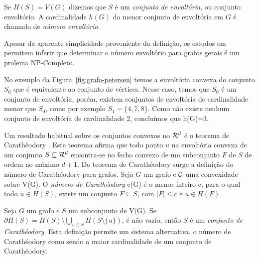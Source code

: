 Se $H(S)=V(G)$ dizemos que $S$ é  um \textit{conjunto de envoltória}, ou conjunto envoltório. 
A cardinalidade $h(G)$ do menor conjunto de envoltória em $G$ é chamado de 
\textit{número envoltório}.

Apesar da aparente simplicidade proveniente da definição,
os estudos em \cite{Dourado2009} permitem inferir que determinar o número envoltório para grafos gerais é um prolema NP-Completo.

No exemplo da Figura~\ref{fig:grafo-petersen} 
temos a envoltória convexa do conjunto $S_0$ que é equivalente ao conjunto de vértices.
Nesse caso, temos que $S_0$ é um conjunto de envoltória, porém, existem conjuntos de envoltória de cardinalidade menor que $S_0$,
como por exemplo $S_1=\{4,7,8\}$. Como não existe nenhum conjunto de envoltória de cardinalidade 2, concluímos que h(G)=3.


Um resultado habitual sobre os conjuntos convexos no ${\cal R}^d$ é o teorema de Carathéodory \cite{Caratheodory1911}.
Este teorema afirma que todo ponto $u$ na envoltória convexa de um conjunto $S \subseteq {\cal R}^d$ encontra-se no fecho
convexo de um subconjunto $F$ de $S$ de ordem no máximo $d+1$. Do teorema de Carathéodory surge  a definição do número de 
Carathéodory para grafos. Seja $G$ um grafo e ${\cal C}$ uma convexidade sobre V(G).
O \textit{número de Carathéodory} c(G) é o menor inteiro c,
para o qual todo $u \in H(S)$, existe um conjunto $F \subseteq  S$,
com $|F| \le c$ e $u \in H(F)$. 

Seja $G$ um grafo e $S$ um subconjunto de V(G). Se $\partial H(S)=H(S) \setminus \bigcup _{u \in S} H(S \setminus \{u\})$,
é não vazio, então $S$ é um \textit{conjunto de Carathéodory}. Esta definição permite um sistema alternativa,
o número de Carathéodory como sendo a maior cardinalidade de um conjunto de Carathéodory. 

